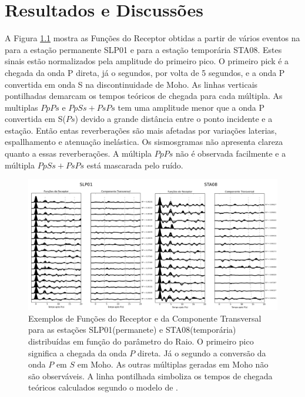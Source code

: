 \chapter{Resultados e Discussões}	



A Figura \ref{RF_SLP01_STA08} mostra as Funções do Receptor obtidas a partir de vários eventos na para a estação permanente SLP01 e para a estação temporária STA08. Estes sinais estão normalizados pela amplitude do primeiro pico. O primeiro pick é a chegada da onda P direta, já o segundos, por volta de 5 segundos, e a onda P convertida em onda S na discontinuidade de Moho. As linhas verticais pontilhadas demarcam os tempos teóricos de chegada para cada múltipla. As multiplas $PpPs$ e $PpSs+PsPs$ tem uma amplitude menor que a onda P convertida em S($Ps$) devido a grande distância entre o ponto incidente e a estação. Então entas reverberações são mais afetadas por variações laterias, espallhamento e atenuação inelástica. Os sismosgramas não apresenta clareza quanto a essas reverberações. A múltipla $PpPs$ não é observada facilmente e a múltipla $PpSs+PsPs$ está mascarada pelo ruído.

\begin{figure}[!ht]
\centering
\includegraphics[scale=0.16]{RF_SLP01_STA08.png}
\caption[Exemplos de Funções do Receptor e da Componente Transversal para as estações SLP01(permanete) e STA08(temporária) distribuídas em função do parâmetro do Raio.]{Exemplos de Funções do Receptor e da Componente Transversal para as estações SLP01(permanete) e STA08(temporária) distribuídas em função do parâmetro do Raio. O primeiro pico significa a chegada da onda $P$ direta. Já o segundo a conversão da onda $P$ em $S$ em Moho. As outras múltiplas geradas em Moho não são observáveis. A linha pontilhada simboliza os tempos de chegada teóricos calculados segundo o modelo de \cite{kennet_iaspei_1991}.}
\label{RF_SLP01_STA08}
\end{figure}

